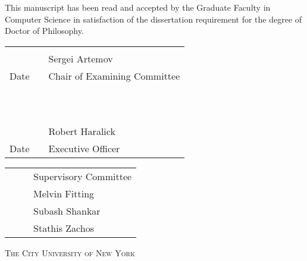 \documentclass[letterpaper, 12pt, oneside]{book}
\begin{document}


\setcounter{page}{3}
\begin{center}
    
    \vspace{.5in}
    This manuscript has been read and accepted by the Graduate Faculty 
    in Computer Science in satisfaction of the dissertation requirement for the degree of Doctor of Philosophy.
    \end{center}
    
    \vspace{1.0in}
    
    \begin{tabular}{p{1.75in}p{0.5in}p{3.5in}}
    \hrulefill                          & &\hrulefill \\
    ~	  			     & & Sergei Artemov\\
    Date                                & & Chair of Examining Committee\\
    ~                                   & & \\
    
    ~                                   & & \\
    \hrulefill                          & &\hrulefill \\
    ~                                   & & Robert Haralick\\
    Date                                & & Executive Officer\\
    \end{tabular}
    
    \vspace{0.75in}
    
    \begin{tabular}{p{1.75in}p{0.5in}p{3.5in}}
    ~ 				& &  Supervisory Committee \\
    ~ 				& &  Melvin Fitting \\
    ~				& &  Subash Shankar \\
    ~				& &  Stathis Zachos \\
    \end{tabular}
    
    
    \vspace{\fill}
    \begin{center}
    \textsc{The City University of New York}
\end{center}
\clearpage
\end{document}
